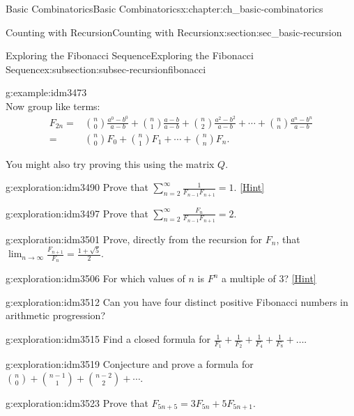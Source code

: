 \documentclass[oneside,10pt,]{book}
\numberwithin{equation}{chapter}
\newcommand{\amp}{&}
\begin{document}
\begin{chapterptx}{Basic Combinatorics}{}{Basic Combinatorics}{}{}{x:chapter:ch_basic-combinatorics}
\begin{sectionptx}{Counting with Recursion}{}{Counting with Recursion}{}{}{x:section:sec_basic-recursion}
\begin{subsectionptx}{Exploring the Fibonacci Sequence}{}{Exploring the Fibonacci Sequence}{}{}{x:subsection:subsec-recursionfibonacci}
\begin{example}{}{g:example:idm3473}
\begin{equation*}
\end{equation*}
Now group like terms:%
\begin{align*}
F_{2n} = \amp \binom{n}{0}\frac{a^0-b^0}{a-b} + \binom{n}{1}\frac{a-b}{a-b} + \binom{n}{2}\frac{a^2-b^2}{a-b}+\cdots + \binom{n}{n}\frac{a^n-b^n}{a-b} \\
= \amp \binom{n}{0}F_0 + \binom{n}{1}F_1 + \cdots + \binom{n}{n}F_n \text{.}
\end{align*}
%
\par
You might also try proving this using the matrix \(Q\).%
\end{example}
\begin{exploration}{}{g:exploration:idm3490}%
Prove that \(\sum_{n = 2}^{\infty}\frac{1}{F_{n - 1}F_{n + 1}} = 1\).%
\space\hspace*{0pt}\hfill{\tiny\hyperlink{g:hint:idm3494-back}{[Hint]}}\end{exploration}
\begin{exploration}{}{g:exploration:idm3497}%
Prove that \(\sum_{n = 2}^{\infty}\frac{F_{n}}{F_{n - 1}F_{n + 1}} = 2.\)%
\end{exploration}
\begin{exploration}{}{g:exploration:idm3501}%
Prove, directly from the recursion for \(F_n\), that \(\lim_{n\to\infty}\frac{F_{n + 1}}{F_{n}} = \frac{1 + \sqrt{5}}{2}.\)%
\end{exploration}
\begin{exploration}{}{g:exploration:idm3506}%
For which values of \(n\) is \(F^{n}\) a multiple of 3?%
\space\hspace*{0pt}\hfill{\tiny\hyperlink{g:hint:idm3511-back}{[Hint]}}\end{exploration}
\begin{exploration}{}{g:exploration:idm3512}%
Can you have four distinct positive Fibonacci numbers in arithmetic progression?%
\end{exploration}
\begin{exploration}{}{g:exploration:idm3515}%
Find a closed formula for \(\frac{1}{F_{1}} + \frac{1}{F_{2}} + \frac{1}{F_{4}} + \frac{1}{F_{8}} + \ldots.\)%
\end{exploration}
\begin{exploration}{}{g:exploration:idm3519}%
Conjecture and prove a formula for \(\binom{n}{0} + \binom{n-1}{1} + \binom{n-2}{2} + \cdots\).%
\end{exploration}
\begin{exploration}{}{g:exploration:idm3523}%
Prove that \(F_{5n + 5} = 3F_{5n} + 5F_{5n + 1}\).%

\end{exploration}
\end{subsectionptx}
\end{sectionptx}
\end{chapterptx}
\end{document}
